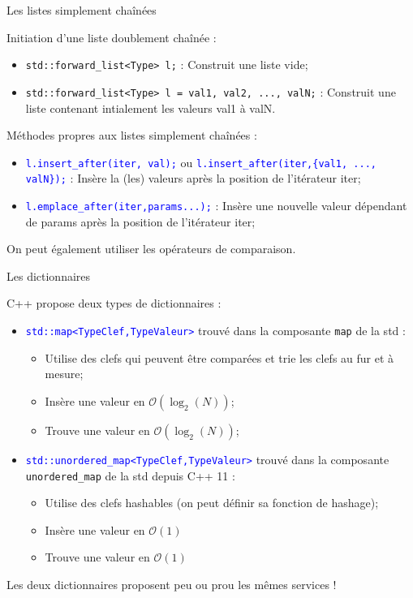 \documentclass[compress,10pt,aspectratio=169]{beamer}
\begin{document}
  \begin{frame}[fragile]{Les listes simplement chaînées}
    \scriptsize
  
    Initiation d'une liste doublement chaînée :
    \begin{itemize}
  \item \texttt{std::forward_list<Type> l;} : Construit une liste vide;
  \item \texttt{std::forward_list<Type> l = {val1, val2, ..., valN};} : Construit une liste contenant intialement les valeurs val1 à valN.
    \end{itemize}
  
    Méthodes propres aux listes simplement chaînées :
  \begin{itemize}
    \item \textcolor{blue}{\texttt{l.insert\_after(iter, val);}} ou \textcolor{blue}{\texttt{l.insert\_after(iter,\{val1, ..., valN\});}} :
    Insère la (les) valeurs après la position de l'itérateur iter;
    \item \textcolor{blue}{\texttt{l.emplace\_after(iter,params...);}} : Insère une nouvelle valeur dépendant de params après la position de l'itérateur iter;
  \end{itemize}
  
  On peut également utiliser les opérateurs de comparaison.
  
  \end{frame}

  \begin{frame}[fragile]{Les dictionnaires}
    \scriptsize
  
    C++ propose deux types de dictionnaires :
  \begin{itemize}
  \item \textcolor{blue}{\texttt{std::map<TypeClef,TypeValeur>}} trouvé dans la composante \texttt{map} de la std :
    \begin{itemize}
      \scriptsize
  \item Utilise des clefs qui peuvent être comparées et trie les clefs au fur et à mesure;
  \item Insère une valeur en $\mathcal{O}(\log_{2}(N))$;
  \item Trouve une valeur en $\mathcal{O}(\log_{2}(N))$;
    \end{itemize}
    \item \textcolor{blue}{\texttt{std::unordered\_map<TypeClef,TypeValeur>}} trouvé dans la composante \texttt{unordered\_map} de la std depuis C++ 11 :
    \begin{itemize}
      \scriptsize
  \item Utilise des clefs hashables (on peut définir sa fonction de hashage);
  \item Insère une valeur en $\mathcal{O}(1)$
  \item Trouve une valeur en $\mathcal{O}(1)$
    \end{itemize}
  \end{itemize}
  
    Les deux dictionnaires proposent peu ou prou les mêmes services !
  \end{frame}
  
\end{document}
